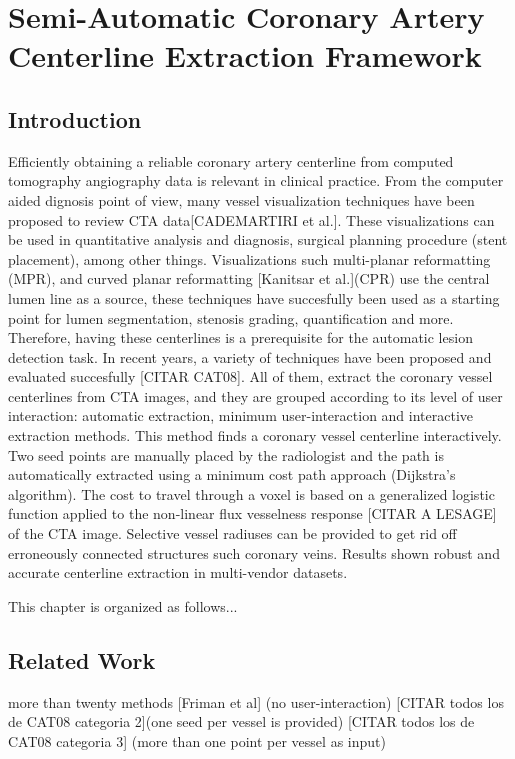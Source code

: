 \chapter{Semi-Automatic Coronary Artery Centerline Extraction Framework}
%

\section{Introduction}
%
Efficiently obtaining a reliable coronary artery centerline from computed tomography angiography data is relevant in clinical practice. From the computer aided dignosis point of view, many vessel visualization techniques have been proposed to review CTA data[CADEMARTIRI et al.].  These visualizations can be used in quantitative analysis and diagnosis, surgical planning procedure (stent placement), among other things. Visualizations such multi-planar reformatting (MPR), and curved planar reformatting [Kanitsar et al.](CPR) use the central lumen line as a source, these techniques have succesfully been used as a starting point for lumen segmentation, stenosis grading, quantification and more. Therefore, having these centerlines is a prerequisite for the automatic lesion detection task.
In recent years, a variety of techniques have been proposed and evaluated succesfully [CITAR CAT08]. All of them, extract the coronary vessel centerlines from CTA images, and they are grouped according to its level of user interaction: automatic extraction, minimum user-interaction and interactive extraction methods.
This method finds a coronary vessel centerline interactively. Two seed points are manually placed by the radiologist and the path is automatically extracted using a minimum cost path approach (Dijkstra’s algorithm). The cost to travel through a voxel is based on a generalized logistic function applied to the non-linear flux vesselness response [CITAR A LESAGE] of the CTA image. Selective vessel radiuses can be provided to get rid off erroneously connected structures such coronary veins. Results shown robust and accurate centerline extraction in multi-vendor datasets.

This chapter is organized as follows... 

\section{Related Work}

more than twenty methods 
[Friman et al] (no user-interaction)
 [CITAR todos los de CAT08 categoria 2](one seed per vessel is provided)
[CITAR todos los de CAT08 categoria 3]  (more than one point per vessel as input)



